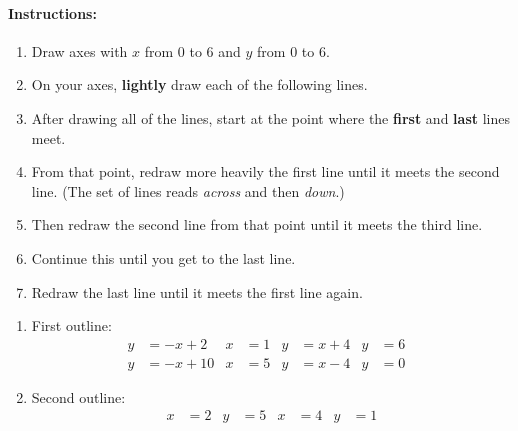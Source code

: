 \documentclass{article}
\def\Instructions{%
  \clearpage
\paragraph{Instructions:}
\begin{enumerate}
\item Draw axes with \(x\) from \(0\) to \(6\) and \(y\) from \(0\) to \(6\).
\item On your axes, \textbf{lightly} draw each of the following lines.
\item After drawing all of the lines, start at the point where the \textbf{first} and \textbf{last} lines meet.
\item From that point, redraw more heavily the first line until it meets the second line.
(The set of lines reads \emph{across} and then \emph{down}.)
\item Then redraw the second line from that point until it meets the third line.
\item Continue this until you get to the last line.
\item Redraw the last line until it meets the first line again.
\end{enumerate}
}
\begin{document}
\Instructions
\begin{enumerate}
\renewcommand\theenumi{\Alph{enumi}}
\item First outline:
\begin{align*}
y &= -x + 2 &
x &= 1 &
y &= x + 4 &
y &= 6 \\
y &= -x + 10 &
x &= 5 &
y &= x - 4 &
y &= 0 &
\end{align*}
\item Second outline:
\begin{align*}
x &= 2 &
y &= 5 &
x &= 4 &
y &= 1
\end{align*}
\end{enumerate}
\end{document}
